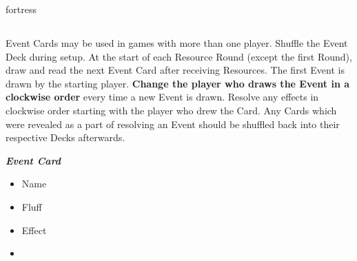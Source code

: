 \begin{multicols*}{2}
\vspace*{1em}
\begin{expansion}[before=\vspace*{-11mm}]{fortress}
  \subsection*{}
  Event Cards may be used in games with more than one player.
  Shuffle the Event Deck during setup.
  At the start of each Resource Round (except the first Round), draw and read the next Event Card after receiving Resources.
  The first Event is drawn by the starting player.
  \textbf{Change the player who draws the Event in a clockwise order} every time a new Event is drawn.
  Resolve any effects in clockwise order starting with the player who drew the Card.
  Any Cards which were revealed as a part of resolving an Event should be shuffled back into their respective Decks afterwards.

  \medskip

  \begin{minipage}[h]{\linewidth}
    \vspace{0.1pt}
    \centering
    \begin{scriptsize}
    \end{scriptsize}
    \footnotesize
    \textbf{\textit{\textcolor{darkcandyapplered}{Event Card}}}
    \begin{multicols}{2}
      \begin{itemize}
        \item[\textbf{1.}] Name
        \item[\textbf{2.}] Fluff
        \item[\textbf{3.}] Effect
        \item[\textbf{\phantom{.}}] \phantom{.}
      \end{itemize}
    \end{multicols}
  \end{minipage}
\end{expansion}


\end{multicols*}
